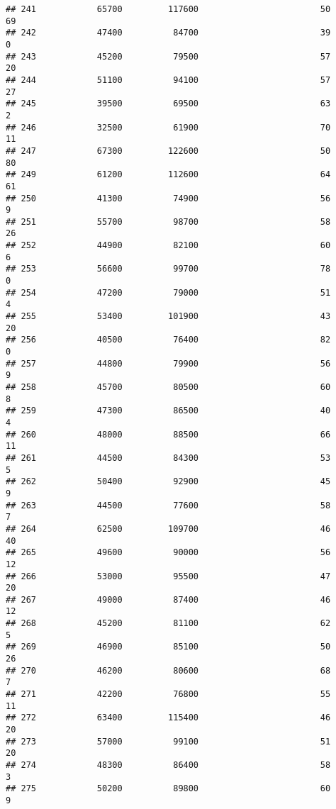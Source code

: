 \documentclass[
]{article}
\begin{document}
\begin{verbatim}
## 241            65700         117600                        50           69
## 242            47400          84700                        39            0
## 243            45200          79500                        57           20
## 244            51100          94100                        57           27
## 245            39500          69500                        63            2
## 246            32500          61900                        70           11
## 247            67300         122600                        50           80
## 249            61200         112600                        64           61
## 250            41300          74900                        56            9
## 251            55700          98700                        58           26
## 252            44900          82100                        60            6
## 253            56600          99700                        78            0
## 254            47200          79000                        51            4
## 255            53400         101900                        43           20
## 256            40500          76400                        82            0
## 257            44800          79900                        56            9
## 258            45700          80500                        60            8
## 259            47300          86500                        40            4
## 260            48000          88500                        66           11
## 261            44500          84300                        53            5
## 262            50400          92900                        45            9
## 263            44500          77600                        58            7
## 264            62500         109700                        46           40
## 265            49600          90000                        56           12
## 266            53000          95500                        47           20
## 267            49000          87400                        46           12
## 268            45200          81100                        62            5
## 269            46900          85100                        50           26
## 270            46200          80600                        68            7
## 271            42200          76800                        55           11
## 272            63400         115400                        46           20
## 273            57000          99100                        51           20
## 274            48300          86400                        58            3
## 275            50200          89800                        60            9

\end{verbatim}
\end{document}
